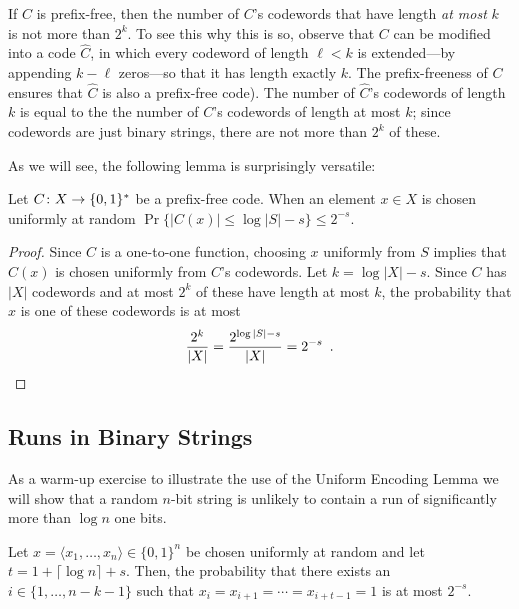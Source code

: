 \documentclass[lotsofwhite]{patmorin}
\begin{document}
If $C$ is prefix-free, then the number of $C$'s codewords that have length
\emph{at most} $k$ is not more than $2^k$. To see this why this is so,
observe that $C$ can be modified into a code $\hat C$, in which every
codeword of length $\ell <k$ is extended---by appending $k-\ell$ zeros---so that
it has length exactly $k$. The prefix-freeness of $C$ ensures that $\hat
C$ is also a prefix-free code). The number of $\hat C$'s codewords of
length $k$ is equal to the the number of $C$'s codewords of length at
most $k$; since codewords are just binary strings, there are not more
than $2^k$ of these.

As we will see, the following lemma is surprisingly versatile:
\begin{lem}
  Let $C\colon X\to \{0,1\}^*$ be a prefix-free code. When an element $x\in X$
  is chosen uniformly at random $\Pr\{|C(x)|\le \log|S|-s\}\le
  2^{-s}$.
\end{lem}

\begin{proof}
  Since $C$ is a one-to-one function, choosing $x$ uniformly from $S$
  implies that $C(x)$ is chosen uniformly from $C$'s codewords. Let
  $k=\log|X|-s$. Since $C$ has $|X|$ codewords and at most $2^{k}$ of these
  have length at most $k$, the probability that $x$ is one of these 
  codewords is at most
  \[
     \frac{2^k}{|X|} = \frac{2^{\log|S|-s}}{|X|} = 2^{-s} \enspace . \qedhere 
  \]
\end{proof}

\subsection{Runs in Binary Strings}

As a warm-up exercise to illustrate the use of the Uniform Encoding
Lemma we will show that a random $n$-bit string is unlikely to contain
a run of significantly more than $\log n$ one bits.

\begin{thm}
  Let $x=\langle x_1,\ldots,x_n\rangle\in\{0,1\}^n$ be chosen
  uniformly at random and let $t=1+\lceil\log n\rceil + s$. Then, the
  probability that there exists an $i\in\{1,\ldots,n-k-1\}$ such that
  $x_i=x_{i+1}=\cdots=x_{i+t-1}=1$ is at most $2^{-s}$.
\end{thm}
\end{document}
